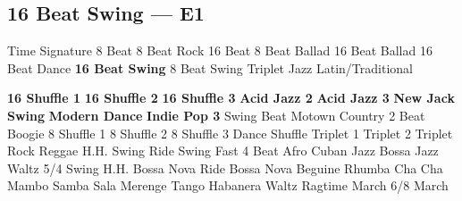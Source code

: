 \subsection{16 Beat Swing --- E1}
Time Signature
8 Beat
8 Beat Rock
16 Beat
8 Beat Ballad
16 Beat Ballad
16 Beat Dance
\textbf{16 Beat Swing}
8 Beat Swing
Triplet
Jazz
Latin/Traditional





























\textbf{16 Shuffle 1}
\textbf{16 Shuffle 2}
\textbf{16 Shuffle 3}
\textbf{Acid Jazz 2}
\textbf{Acid Jazz 3}
\textbf{New Jack Swing}
\textbf{Modern Dance}
\textbf{Indie Pop 3}
Swing Beat
Motown
Country 2 Beat
Boogie
8 Shuffle 1
8 Shuffle 2
8 Shuffle 3
Dance Shuffle
Triplet 1
Triplet 2
Triplet Rock
Reggae
H.H. Swing
Ride Swing
Fast 4 Beat
Afro Cuban
Jazz Bossa
Jazz Waltz
5/4 Swing
H.H. Bossa Nova
Ride Bossa Nova
Beguine
Rhumba
Cha Cha
Mambo
Samba
Sala
Merenge
Tango
Habanera
Waltz
Ragtime
March
6/8 March
